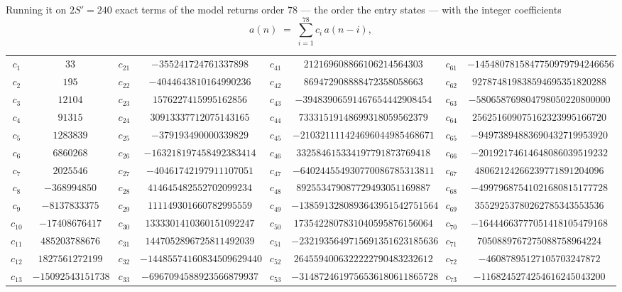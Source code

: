 \documentclass[11pt,a4paper]{article}
\theoremstyle{plain}
\theoremstyle{definition}
\begin{document}
Running it on $2S'=240$ exact terms of the model returns order $78$ --- the order the
entry states --- with the integer coefficients
\[
a(n)\;=\;\sum_{i=1}^{78}c_i\,a(n-i),
\]
\begin{center}\small
\begin{tabular}{cccccccc}
$c_{1}$ & $33$ & $c_{21}$ & $-355241724761337898$ & $c_{41}$ & $212169608866106214564303$ & $c_{61}$ & $-1454807815847750979794246656$ \\
$c_{2}$ & $195$ & $c_{22}$ & $-4044643810164990236$ & $c_{42}$ & $869472908888472358058663$ & $c_{62}$ & $927874819838594695351820288$ \\
$c_{3}$ & $12104$ & $c_{23}$ & $1576227415995162856$ & $c_{43}$ & $-39483906591467654442908454$ & $c_{63}$ & $-580658769804798050220800000$ \\
$c_{4}$ & $91315$ & $c_{24}$ & $30913337712075143165$ & $c_{44}$ & $73331519148699318059562379$ & $c_{64}$ & $256251609075162323995166720$ \\
$c_{5}$ & $1283839$ & $c_{25}$ & $-379193490000339829$ & $c_{45}$ & $-210321111424696044985468671$ & $c_{65}$ & $-94973894883690432719953920$ \\
$c_{6}$ & $6860268$ & $c_{26}$ & $-163218197458492383414$ & $c_{46}$ & $332584615334197791873769418$ & $c_{66}$ & $-20192174614648086039519232$ \\
$c_{7}$ & $2025546$ & $c_{27}$ & $-40461742197911107051$ & $c_{47}$ & $-640244554930770086785313811$ & $c_{67}$ & $48062124266239771891204096$ \\
$c_{8}$ & $-368994850$ & $c_{28}$ & $414645482552702099234$ & $c_{48}$ & $892553479087729493051169887$ & $c_{68}$ & $-49979687541021680815177728$ \\
$c_{9}$ & $-8137833375$ & $c_{29}$ & $111149301660782995559$ & $c_{49}$ & $-1385913280893643951542751564$ & $c_{69}$ & $35529253780262785343553536$ \\
$c_{10}$ & $-17408676417$ & $c_{30}$ & $1333301410360151092247$ & $c_{50}$ & $1735422807831040595876156064$ & $c_{70}$ & $-16444663777051418105479168$ \\
$c_{11}$ & $485203788676$ & $c_{31}$ & $1447052896725811492039$ & $c_{51}$ & $-2321935649715691351623185636$ & $c_{71}$ & $7050889767275088758964224$ \\
$c_{12}$ & $1827561272199$ & $c_{32}$ & $-14485574160834509629440$ & $c_{52}$ & $2645594006322222790483232612$ & $c_{72}$ & $-46087895127105703247872$ \\
$c_{13}$ & $-15092543151738$ & $c_{33}$ & $-6967094588923566879937$ & $c_{53}$ & $-3148724619756536180611865728$ & $c_{73}$ & $-1168245274254616245043200$ \\

\end{tabular}
\end{center}
\end{document}
